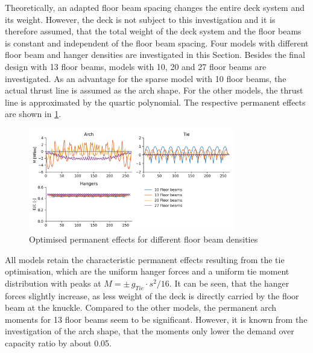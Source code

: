Theoretically, an adapted floor beam spacing changes the entire deck system and its weight. However, the deck is not subject to this investigation and it is therefore assumed, that the total weight of the deck system and the floor beams is constant and independent of the floor beam spacing. Four models with different floor beam and hanger densities are investigated in this Section. Besides the final design with 13 floor beams, models with 10, 20 and 27 floor beams are investigated. As an advantage for the sparse model with 10 floor beams, the actual thrust line is assumed as the arch shape. For the other models, the thrust line is approximated by the quartic polynomial. The respective permanent effects are shown in \cref{fig:fb_permanent}.

\begin{figure}[H]
    \centering
    \includegraphics[width=0.8\textwidth]{calculations/floor beam comparison/permanent state.png}
    \caption{Optimised permanent effects for different floor beam densities}
    \label{fig:fb_permanent}
\end{figure}

All models retain the characteristic permanent effects resulting from the tie optimisation, which are the uniform hanger forces and a uniform tie moment distribution with peaks at $M=\pm\,g_{Tie} \cdot s^2 / 16$. It can be seen, that the hanger forces slightly increase, as less weight of the deck is directly carried by the floor beam at the knuckle. Compared to the other models, the permanent arch moments for 13 floor beams seem to be significant. However, it is known from the investigation of the arch shape, that the moments only lower the demand over capacity ratio by about 0.05. \medskip


